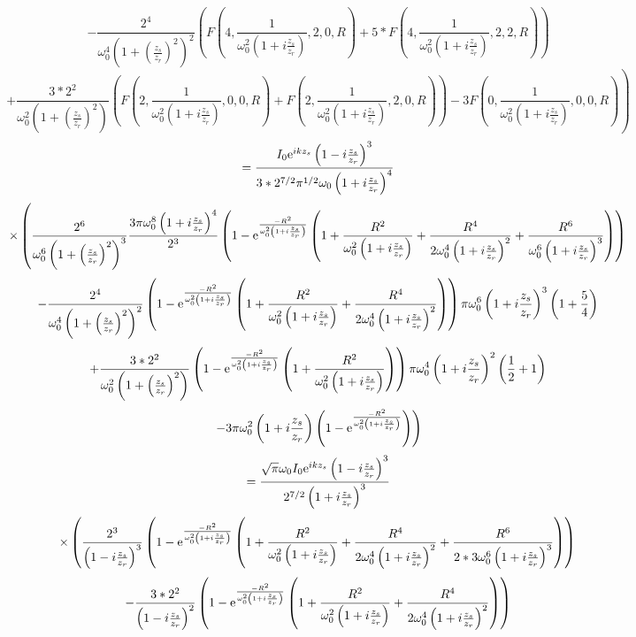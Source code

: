 \documentclass[11pt]{amsart}
\makeatletter
\newcommand{\e}{{\rm e}}				%
\newcommand{\0}{\varnothing}		%
\newcommand{\1}{!}
\newcommand{\2}{@}
\newcommand{\3}{\#}
\newcommand{\4}{\$}
\newcommand{\5}{\%}
\newcommand{\6}{$^\wedge$}
\newcommand{\7}{\&}
\newcommand{\8}{*}
\newcommand{\9}{(}
\makeatother
\begin{document}
\[
\left.- \frac{2^4}{\omega_0^4\left(1+\left(\frac{z_s}{z_r}\right)^2\right)^2}\left(F\left(4,\frac{1}{\omega_0^2\left(1+i\frac{z_s}{z_r}\right)},2,0,R\right)+5*F\left(4,\frac{1}{\omega_0^2\left(1+i\frac{z_s}{z_r}\right)},2,2,R\right)\right) \right.
\]
\[
\left.+\frac{3*2^2}{\omega_0^2\left(1+\left(\frac{z_s}{z_r}\right)^2\right)}\left(F\left(2,\frac{1}{\omega_0^2\left(1+i\frac{z_s}{z_r}\right)},0,0,R\right)+F\left(2,\frac{1}{\omega_0^2\left(1+i\frac{z_s}{z_r}\right)},2,0,R\right)\right)-3F\left(0,\frac{1}{\omega_0^2\left(1+i\frac{z_s}{z_r}\right)},0,0,R\right)\right)
\]
\[
=\frac{I_0\e^{ikz_s}\left(1-i\frac{z_s}{z_r}\right)^3}{3*2^{7/2}\pi^{1/2}\omega_0\left(1+i\frac{z_s}{z_r}\right)^4}
\]
\[
\times\left(\frac{2^6}{\omega_0^6\left(1+\left(\frac{z_s}{z_r}\right)^2\right)^3}\frac{3\pi\omega_0^8\left(1+i\frac{z_s}{z_r}\right)^4}{2^3}\left(1-\e^{\frac{-R^2}{\omega_0^2\left(1+i\frac{z_s}{z_r}\right)}}\left(1+\frac{R^2}{\omega_0^2\left(1+i\frac{z_s}{z_r}\right)}+\frac{R^4}{2\omega_0^4\left(1+i\frac{z_s}{z_r}\right)^2} + \frac{R^6}{\omega_0^6\left(1+i\frac{z_s}{z_r}\right)^3}\right)\right)\right.
\]
\[
\left. - \frac{2^4}{\omega_0^4\left(1+\left(\frac{z_s}{z_r}\right)^2\right)^2}\left(1-\e^{\frac{-R^2}{\omega_0^2\left(1+i\frac{z_s}{z_r}\right)}}\left(1+\frac{R^2}{\omega_0^2\left(1+i\frac{z_s}{z_r}\right)}+\frac{R^4}{2\omega_0^4\left(1+i\frac{z_s}{z_r}\right)^2} \right)\right)\pi\omega_0^6\left(1+i\frac{z_s}{z_r}\right)^3\left(1+\frac{5}{4}\right)\right.
\]
\[
\left. +\frac{3*2^2}{\omega_0^2\left(1+\left(\frac{z_s}{z_r}\right)^2\right)}\left(1-\e^{\frac{-R^2}{\omega_0^2\left(1+i\frac{z_s}{z_r}\right)}}\left(1+\frac{R^2}{\omega_0^2\left(1+i\frac{z_s}{z_r}\right)}\right)\right)\pi\omega_0^4\left(1+i\frac{z_s}{z_r}\right)^2\left(\frac{1}{2}+1\right)\right.
\]
\[
\left. -3\pi\omega_0^2\left(1+i\frac{z_s}{z_r}\right)\left(1-\e^{\frac{-R^2}{\omega_0^2\left(1+i\frac{z_s}{z_r}\right)}}\right)\right)
\]
\[
=\frac{\sqrt{\pi}\omega_0I_0\e^{ikz_s}\left(1-i\frac{z_s}{z_r}\right)^3}{2^{7/2}\left(1+i\frac{z_s}{z_r}\right)^3}
\]
\[
\times\left(\frac{2^3}{\left(1-i\frac{z_s}{z_r}\right)^3}\left(1-\e^{\frac{-R^2}{\omega_0^2\left(1+i\frac{z_s}{z_r}\right)}}\left(1+\frac{R^2}{\omega_0^2\left(1+i\frac{z_s}{z_r}\right)}+\frac{R^4}{2\omega_0^4\left(1+i\frac{z_s}{z_r}\right)^2} + \frac{R^6}{2*3\omega_0^6\left(1+i\frac{z_s}{z_r}\right)^3}\right)\right)\right.
\]
\[
\left. - \frac{3*2^2}{\left(1-i\frac{z_s}{z_r}\right)^2}\left(1-\e^{\frac{-R^2}{\omega_0^2\left(1+i\frac{z_s}{z_r}\right)}}\left(1+\frac{R^2}{\omega_0^2\left(1+i\frac{z_s}{z_r}\right)}+\frac{R^4}{2\omega_0^4\left(1+i\frac{z_s}{z_r}\right)^2} \right)\right)\right.
\]
\end{document}
